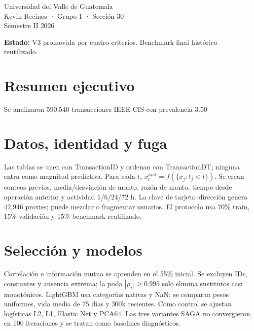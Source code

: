 \documentclass[10pt]{article}
\begin{document}
\begin{titlepage}\pagecolor{navy}\color{white}\raggedright\vspace*{1cm}{\Large DEEP LEARNING Y SISTEMAS INTELIGENTES\par}\vspace{1cm}{\Huge\bfseries Proyecto 1\\Monitoreo transaccional --- V3\par}\vspace{.7cm}{\LARGE LightGBM nativo, recencia y validación temporal\par}\vfill{\Large Universidad del Valle de Guatemala\\Kevin Recinos · Grupo 1 · Sección 30\\Semestre II 2026\par}\vspace{1cm}{\Large Wilson Alejandro Calderón Argueta · 22018\\Pablo Daniel Barillas Moreno · 22193\par}\vfill\textbf{Estado:} V3 promovida por cuatro criterios. Benchmark final histórico reutilizado.\end{titlepage}\nopagecolor

\section*{Resumen ejecutivo} Se analizaron 590,540 transacciones IEEE-CIS con prevalencia 3.50%

\section{Datos, identidad y fuga} Las tablas se unen con TransactionID y ordenan con TransactionDT; ninguna entra como magnitud predictiva. Para cada $t$, $x_t^{hist}=f(\{x_j:t_j<t\})$. Se crean conteos previos, media/desviación de monto, razón de monto, tiempo desde operación anterior y actividad 1/6/24/72 h. La clave de tarjeta--dirección genera 42,946 proxies; puede mezclar o fragmentar usuarios. El protocolo usa 70\% train, 15\% validación y 15\% benchmark reutilizado.

\section{Selección y modelos} Correlación e información mutua se aprenden en el 55\% inicial. Se excluyen IDs, constantes y ausencia extrema; la poda $|\rho_s|\ge0.995$ solo elimina sustitutos casi monotónicos. LightGBM usa categorías nativas y NaN; se comparan pesos uniformes, vida media de 75 días y 300k recientes. Como control se ajustan logísticas L2, L1, Elastic Net y PCA64. Las tres variantes SAGA no convergieron en 100 iteraciones y se tratan como baselines diagnósticos.
\end{document}
